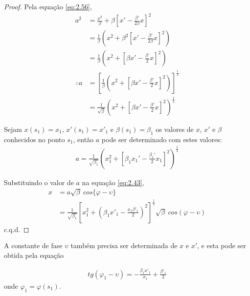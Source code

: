 \begin{proof}
	Pela equação \eqref{eq:2.56},
	\begin{align*}
        a^2 &= \frac{x^2}{\beta} + \beta\left[x'-\frac{\beta'}{2\beta}x\right]^2\\
        	&= \frac{1}{\beta}\left(x^2 + \beta^2\left[x'-\frac{\beta'}{2\beta}x\right]^2\right)\\
        	&= \frac{1}{\beta}\left(x^2 + \left[\beta x'-\frac{\beta'}{2}x\right]^2\right)\\
        \therefore a &= \left[\frac{1}{\beta}\left(x^2 + \left[\beta x'-\frac{\beta'}{2}x\right]^2\right)\right]^\frac{1}{2}\\
        	&= \frac{1}{\sqrt{\beta}}\left(x^2 + \left[\beta x'-\frac{\beta'}{2}x\right]^2\right)^\frac{1}{2}
	\end{align*}
	
	Sejam $x(s_1)=x_1$, $x'(s_1)=x'_1$ e $\beta(s_1)=\beta_1$ os valores de $x$, $x'$ e $\beta$ conhecidos no ponto $s_1$, então $a$ pode ser determinado com estes valores:
	\begin{align*}
		a = \frac{1}{\sqrt{\beta_1}}\left(x_1^2 + \left[\beta_1 x_1'-\frac{\beta_1'}{2}x_1\right]^2\right)^\frac{1}{2}
	\end{align*}
	
	Substituindo o valor de $a$ na equação \eqref{eq:2.43},
	\begin{align*}
		x &= a\sqrt{\beta}\ cos\{\varphi-\upsilon\}\\
		  &= \frac{1}{\sqrt{\beta_1}}\left[x_1^2+\left(\beta_1x'_1-\frac{x_1\beta'_1}{2}\right)^2\right]^\frac{1}{2}\sqrt{\beta}\ cos(\varphi-\upsilon)
	\end{align*}
	c.q.d.
\end{proof}
	
A constante de fase $\upsilon$ também precisa ser determinada de $x$ e $x'$, e esta pode ser obtida pela equação
	
\begin{align}
	tg(\varphi_1 - \upsilon) = -\frac{\beta_1 x'_1}{x_1}+\frac{\beta'_1}{2}
\end{align}
onde $\varphi_1 = \varphi(s_1)$.
	

